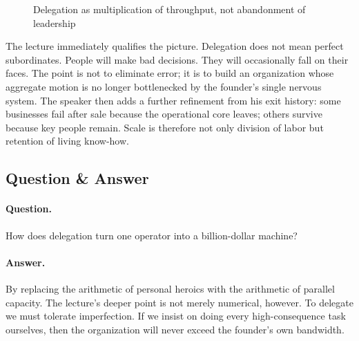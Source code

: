 \begin{figure}[h]
\centering
{}
\caption{Delegation as multiplication of throughput, not abandonment of leadership}
\end{figure}

The lecture immediately qualifies the picture. Delegation does not mean perfect subordinates. People will make bad decisions. They will occasionally fall on their faces. The point is not to eliminate error; it is to build an organization whose aggregate motion is no longer bottlenecked by the founder's single nervous system. The speaker then adds a further refinement from his exit history: some businesses fail after sale because the operational core leaves; others survive because key people remain. Scale is therefore not only division of labor but retention of living know-how.

\subsection{Question \& Answer}

\paragraph{Question.} How does delegation turn one operator into a billion-dollar machine?

\paragraph{Answer.} By replacing the arithmetic of personal heroics with the arithmetic of parallel capacity. The lecture's deeper point is not merely numerical, however. To delegate we must tolerate imperfection. If we insist on doing every high-consequence task ourselves, then the organization will never exceed the founder's own bandwidth.

